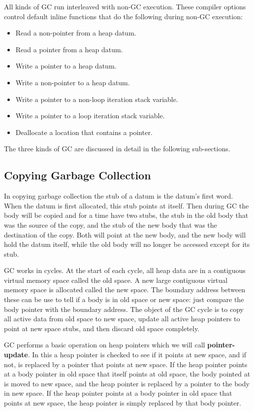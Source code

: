 \documentclass[12pt]{article}
\newcommand{\key}[1]{{\rm \bfseries #1}}
\begin{document}
All kinds of GC run interleaved with non-GC execution.
These compiler options control default inline functions that do the
following during non-GC execution:
\begin{itemize}
\item Read a non-pointer from a heap datum.
\item Read a pointer from a heap datum.
\item Write a pointer to a heap datum.
\item Write a non-pointer to a heap datum.
\item Write a pointer to a non-loop iteration stack variable.
\item Write a pointer to a loop iteration stack variable.
\item Deallocate a location that contains a pointer.
\end{itemize}

The three kinds of GC are discussed in detail in the following sub-sections.


\subsection{Copying Garbage Collection}
\label{COPYING-GARBAGE-COLLECTION}

In copying garbage collection the stub of a datum is the datum's
first word.  When the datum is first allocated, this
stub points at itself.  Then during GC the body will be
copied and for a time have two stubs, the stub in the old
body that was the source of the copy, and the stub of the
new body that was the destination of the copy.  Both will
point at the new body, and the new body will hold the
datum itself, while the old body will no longer be accessed
except for its stub.

GC works in cycles.  At the start of each cycle, all heap
data are in a contiguous virtual memory space called the
old space.  A new large contiguous virtual memory space
is allocated called the new space.  The boundary address
between these can be use to tell if a body is in old space
or new space: just compare the body pointer with the boundary
address.  The object of the GC cycle is to copy all active
data from old space to new space, update all active heap pointers
to point at new space stubs, and then discard old space
completely.

GC performs a basic operation on heap pointers which
we will call \key{pointer-update}.  In this a heap pointer is
checked to see if it points at new space, and if not,
is replaced by a pointer that points at new space.
If the heap pointer points at a body pointer in old space
that itself points at old space, the body pointed at is
moved to new space, and the heap pointer is replaced by
a pointer to the body in new space.  If the heap pointer
points at a body pointer in old space that points at new space, the
heap pointer is simply replaced by that body pointer.
\end{document}
